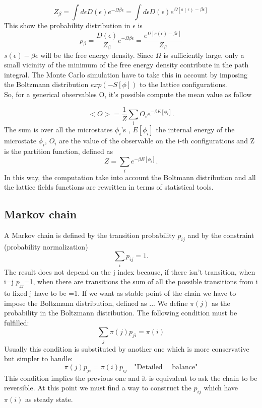$$
    Z_\beta=\int d\epsilon D(\epsilon) e^{-\Omega\beta\epsilon}=\int d\epsilon D(\epsilon) e^{\Omega[s(\epsilon)-\beta\epsilon]}
$$ 
\noindent
This show the probability distribution in $\epsilon$ is
$$
    \rho_\beta=\frac{D(\epsilon)}{Z_\beta}e^{-\Omega\beta\epsilon}=\frac{e^{\Omega[s(\epsilon)-\beta\epsilon]}}{Z_\beta}
$$
\noindent
$s(\epsilon)-\beta\epsilon$ will be the free energy density. Since $\Omega$ is sufficiently large, only a small vicinity of the minimum of the free energy density 
contribute in the path integral. The Monte Carlo simulation have to take this in account by imposing the Boltzmann distribution $exp(-S[\phi])$ to the lattice
configurations.\\
\noindent
So, for a generical observables O, it's possible compute the mean value as follow
 
$$
    <O>=\frac{1}{Z}\displaystyle\sum_{i}O_ie^{-\beta E[\phi_i]}.
$$
\noindent
The sum is over all the microstates $\phi_i$'s , $E[\phi_i]$ the internal energy of the microstate $\phi_i$, $O_i$ are the value 
of the observable on the i-th configurations and Z is the partition function, defined as \cite{CaselleMontecarlo}
$$
      Z=\displaystyle\sum_{i}e^{-\beta E[\phi_i]}.
$$
\noindent
In this way, the computation take into account the Boltmann distribution and all the lattice fields functions are rewritten in terms of statistical tools.
\subsection{Markov chain}
    A Markov chain is defined by the transition probability $p_{ij}$ and by the constraint (probability normalization) \cite{CaselleMontecarlo}
    $$
        \displaystyle\sum_{i}p_{ij}=1.
    $$
    \noindent
    The result does not depend on the j index because, if there isn't transition, when i=j $p_{jj}$=1, when there are transitions the sum of 
    all the possible transitions from i to fixed j have to be =1.
    If we want as stable point of the chain we have to impose the Boltzmann distribution, defined as ... 
    We define $\pi(j)$ as the probability in the Boltzmann distribution. The following condition 
    must be fulfilled:
    $$
        \displaystyle\sum_{j}\pi(j)p_{ji}=\pi(i)
    $$
    Usually this condition is substituted by another one which is more conservative but simpler to handle:
    $$
        \pi(j)p_{ji}=\pi(i)p_{ij}\quad\text{"Detailed}\quad\text{ balance"}
    $$
    This condition implies the previous one and it is equivalent to ask the chain to be reversible. 
    At this point we must find a way to construct the $p_{ij}$ which have $\pi(i)$ as steady state.

